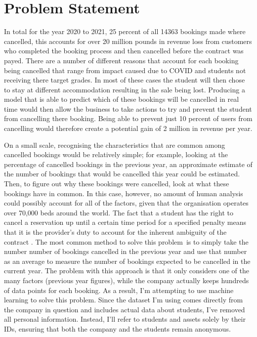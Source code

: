\section{Problem Statement}

In total for the year 2020 to 2021, 25 percent of all 14363 bookings made where cancelled, this accounts for over 20 million pounds in revenue loss from customers who completed the booking process and then cancelled before the contract was payed. There are a number of different reasons that account for each booking being cancelled that range from impact caused due to COVID and students not receiving there target grades. In most of these cases the student will then chose to stay at different accommodation resulting in the sale being lost. Producing a model that is able to predict which of these bookings will be cancelled in real time would then allow the business to take actions to try and prevent the student from cancelling there booking. Being able to prevent just 10 percent of users from cancelling would therefore create a potential gain of 2 million in revenue per year.  

\vspace{5mm}

On a small scale, recognising the characteristics that are common among cancelled bookings would be relatively simple; for example, looking at the percentage of cancelled bookings in the previous year, an approximate estimate of the number of bookings that would be cancelled this year could be estimated. Then, to figure out why these bookings were cancelled, look at what these bookings have in common. In this case, however, no amount of human analysis could possibly account for all of the factors, given that the organisation operates over 70,000 beds around the world. The fact that a student has the right to cancel a reservation up until a certain time period for a specified penalty means that it is the provider's duty to account for the inherent ambiguity of the contract . The most common method to solve this problem is to simply take the number number of bookings cancelled in the previous year and use that number as an average to measure the number of bookings expected to be cancelled in the current year. The problem with this approach is that it only considers one of the many factors (previous year figures), while the company actually keeps hundreds of data points for each booking. As a result, I'm attempting to use machine learning to solve this problem. Since the dataset I'm using comes directly from the company in question and includes actual data about students, I've removed all personal information. Instead, I'll refer to students and assets solely by their IDs, ensuring that both the company and the students remain anonymous.
    
